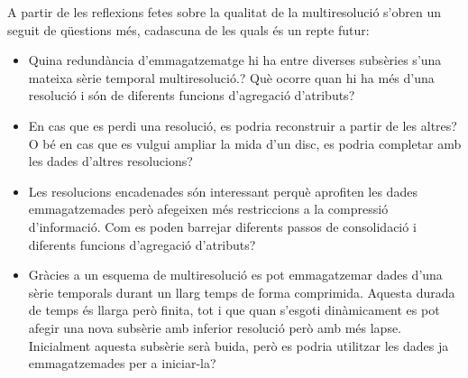 A partir de les reflexions fetes sobre la qualitat de la
multiresolució s'obren un seguit de qüestions més, cadascuna de les
quals és un repte futur:
\begin{itemize}
\item Quina redundància d'emmagatzematge hi ha entre diverses
  subsèries s'una mateixa sèrie temporal multiresolució.? Què ocorre
  quan hi ha més d'una resolució i són de diferents funcions
  d'agregació d'atributs?

\item En cas que es perdi una resolució, es podria reconstruir a
  partir de les altres? O bé en cas que es vulgui ampliar la mida d'un
  disc, es podria completar amb les dades d'altres resolucions?

\item Les resolucions encadenades són interessant perquè aprofiten les
  dades emmagatzemades però afegeixen més restriccions a la compressió
  d'informació. Com es poden barrejar diferents passos de consolidació
  i diferents funcions d'agregació d'atributs?


\item Gràcies a un esquema de multiresolució es pot emmagatzemar dades
  d'una sèrie temporals durant un llarg temps de forma
  comprimida. Aquesta durada de temps és llarga però finita, tot i que
  quan s'esgoti dinàmicament es pot afegir una nova subsèrie amb
  inferior resolució però amb més lapse. Inicialment aquesta subsèrie
  serà buida, però es podria utilitzar les dades ja emmagatzemades per
  a iniciar-la?

\end{itemize}
























